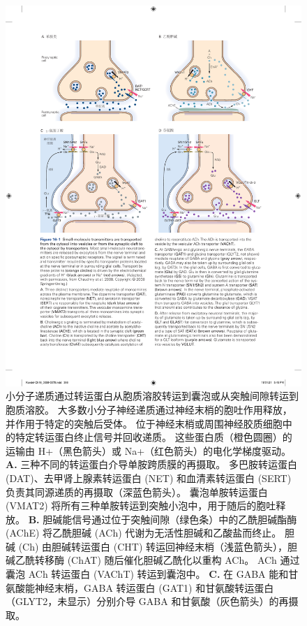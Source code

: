 \begin{figure}[htbp]
	\centering
	\includegraphics[width=0.95\linewidth]{chap16/fig_16_1}
	\caption{小分子递质通过转运蛋白从胞质溶胶转运到囊泡或从突触间隙转运到胞质溶胶。
		大多数小分子神经递质通过神经末梢的胞吐作用释放，并作用于特定的突触后受体。
		位于神经末梢或周围神经胶质细胞中的特定转运蛋白终止信号并回收递质。
		这些蛋白质（橙色圆圈）的运输由 H+（黑色箭头）或 Na+（红色箭头）的电化学梯度驱动\cite{chaudhry2008pharmacology}。 
		\textbf{A.} 三种不同的转运蛋白介导单胺跨质膜的再摄取。
		多巴胺转运蛋白 (DAT)、去甲肾上腺素转运蛋白 (NET) 和血清素转运蛋白 (SERT) 负责其同源递质的再摄取（深蓝色箭头）。
		囊泡单胺转运蛋白 (VMAT2) 将所有三种单胺转运到突触小泡中，用于随后的胞吐释放。
		\textbf{B.} 胆碱能信号通过位于突触间隙（绿色条）中的乙酰胆碱酯酶 (AChE) 将乙酰胆碱 (ACh) 代谢为无活性胆碱和乙酸盐而终止。
		胆碱 (Ch) 由胆碱转运蛋白 (CHT) 转运回神经末梢（浅蓝色箭头），胆碱乙酰转移酶 (ChAT) 随后催化胆碱乙酰化以重构 ACh。 ACh 通过囊泡 ACh 转运蛋白 (VAChT) 转运到囊泡中。
		\textbf{C.} 在 GABA 能和甘氨酸能神经末梢，GABA 转运蛋白 (GAT1) 和甘氨酸转运蛋白（GLYT2，未显示）分别介导 GABA 和甘氨酸（灰色箭头）的再摄取。
}
\end{figure}
